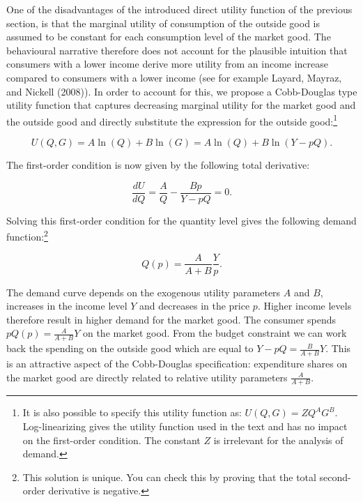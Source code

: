 \documentclass[
]{book}
\begin{document}
One of the disadvantages of the introduced direct utility function of the previous section, is that the marginal utility of consumption of the outside good is assumed to be constant for each consumption level of the market good. The behavioural narrative therefore does not account for the plausible intuition that consumers with a lower income derive more utility from an income increase compared to consumers with a lower income (see for example Layard, Mayraz, and Nickell (2008)). In order to account for this, we propose a Cobb-Douglas type utility function that captures decreasing marginal utility for the market good and the outside good and directly substitute the expression for the outside good:\footnote{It is also possible to specify this utility function as: \(U(Q,G)=Z Q^A G^B\). Log-linearizing gives the utility function used in the text and has no impact on the first-order condition. The constant \(Z\) is irrelevant for the analysis of demand.}

\begin{equation}
U(Q,G) = A\ln(Q) + B\ln(G) = A \ln(Q) + B \ln (Y - p Q). 
\end{equation}

The first-order condition is now given by the following total derivative:

\begin{equation}
\frac{d U}{d Q} = \frac{A}{Q} - \frac{B p}{Y - p Q} = 0. 
\label{eq:cdfoc}
\end{equation}

Solving this first-order condition for the quantity level gives the following demand function:\footnote{This solution is unique. You can check this by proving that the total second-order derivative is negative.}

\begin{equation}
Q(p) = \frac{A}{A + B}\frac{Y}{p}.
\end{equation}

The demand curve depends on the exogenous utility parameters \(A\) and \(B\), increases in the income level \(Y\) and decreases in the price \(p\). Higher income levels therefore result in higher demand for the market good. The consumer spends \(p Q(p)=\frac{A}{A+B} Y\) on the market good. From the budget constraint we can work back the spending on the outside good which are equal to \(Y-pQ=\frac{B}{A+B} Y\). This is an attractive aspect of the Cobb-Douglas specification: expenditure shares on the market good are directly related to relative utility parameters \(\frac{A}{A+B}\).
\end{document}
